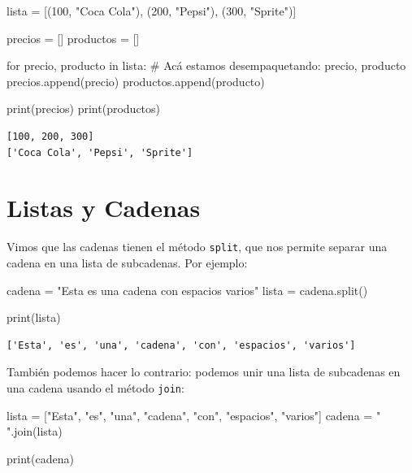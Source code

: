 \documentclass[
  letterpaper,
  DIV=11,
  numbers=noendperiod]{scrreprt}
\newenvironment{Shaded}{\begin{snugshade}}{\end{snugshade}}
\newcommand{\BuiltInTok}[1]{\textcolor[rgb]{0.00,0.23,0.31}{#1}}
\newcommand{\CommentTok}[1]{\textcolor[rgb]{0.37,0.37,0.37}{#1}}
\newcommand{\ControlFlowTok}[1]{\textcolor[rgb]{0.00,0.23,0.31}{#1}}
\newcommand{\DecValTok}[1]{\textcolor[rgb]{0.68,0.00,0.00}{#1}}
\newcommand{\KeywordTok}[1]{\textcolor[rgb]{0.00,0.23,0.31}{#1}}
\newcommand{\NormalTok}[1]{\textcolor[rgb]{0.00,0.23,0.31}{#1}}
\newcommand{\OperatorTok}[1]{\textcolor[rgb]{0.37,0.37,0.37}{#1}}
\newcommand{\StringTok}[1]{\textcolor[rgb]{0.13,0.47,0.30}{#1}}
\begin{document}
\begin{Shaded}
\begin{Highlighting}[]
\NormalTok{lista }\OperatorTok{=}\NormalTok{ [(}\DecValTok{100}\NormalTok{, }\StringTok{"Coca Cola"}\NormalTok{), (}\DecValTok{200}\NormalTok{, }\StringTok{"Pepsi"}\NormalTok{), (}\DecValTok{300}\NormalTok{, }\StringTok{"Sprite"}\NormalTok{)]}

\NormalTok{precios }\OperatorTok{=}\NormalTok{ []}
\NormalTok{productos }\OperatorTok{=}\NormalTok{ []}

\ControlFlowTok{for}\NormalTok{ precio, producto }\KeywordTok{in}\NormalTok{ lista: }\CommentTok{\# Acá estamos desempaquetando: precio, producto}
\NormalTok{    precios.append(precio)}
\NormalTok{    productos.append(producto)}

\BuiltInTok{print}\NormalTok{(precios)}
\BuiltInTok{print}\NormalTok{(productos)}
\end{Highlighting}
\end{Shaded}

\begin{verbatim}
[100, 200, 300]
['Coca Cola', 'Pepsi', 'Sprite']
\end{verbatim}

\hypertarget{listas-y-cadenas}{%
\section{Listas y Cadenas}\label{listas-y-cadenas}}

Vimos que las cadenas tienen el método \texttt{split}, que nos permite
separar una cadena en una lista de subcadenas. Por ejemplo:

\begin{Shaded}
\begin{Highlighting}[]
\NormalTok{cadena }\OperatorTok{=} \StringTok{"Esta es una      cadena con    espacios   varios"}
\NormalTok{lista }\OperatorTok{=}\NormalTok{ cadena.split()}

\BuiltInTok{print}\NormalTok{(lista)}
\end{Highlighting}
\end{Shaded}

\begin{verbatim}
['Esta', 'es', 'una', 'cadena', 'con', 'espacios', 'varios']
\end{verbatim}

También podemos hacer lo contrario: podemos unir una lista de subcadenas
en una cadena usando el método \texttt{join}:

\begin{Shaded}
\begin{Highlighting}[]
\NormalTok{lista }\OperatorTok{=}\NormalTok{ [}\StringTok{"Esta"}\NormalTok{, }\StringTok{"es"}\NormalTok{, }\StringTok{"una"}\NormalTok{, }\StringTok{"cadena"}\NormalTok{, }\StringTok{"con"}\NormalTok{, }\StringTok{"espacios"}\NormalTok{, }\StringTok{"varios"}\NormalTok{]}
\NormalTok{cadena }\OperatorTok{=} \StringTok{" "}\NormalTok{.join(lista)}

\BuiltInTok{print}\NormalTok{(cadena)}
\end{Highlighting}
\end{Shaded}
\end{document}
